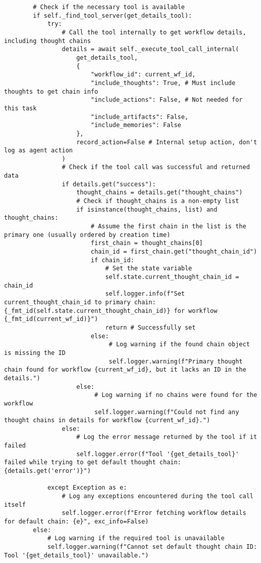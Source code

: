 \documentclass[12pt,a4paper]{article}
\begin{document}
\begin{pageablecode}
\begin{verbatim}
        # Check if the necessary tool is available
        if self._find_tool_server(get_details_tool):
            try:
                # Call the tool internally to get workflow details, including thought chains
                details = await self._execute_tool_call_internal(
                    get_details_tool,
                    {
                        "workflow_id": current_wf_id,
                        "include_thoughts": True, # Must include thoughts to get chain info
                        "include_actions": False, # Not needed for this task
                        "include_artifacts": False,
                        "include_memories": False
                    },
                    record_action=False # Internal setup action, don't log as agent action
                )
                # Check if the tool call was successful and returned data
                if details.get("success"):
                    thought_chains = details.get("thought_chains")
                    # Check if thought_chains is a non-empty list
                    if isinstance(thought_chains, list) and thought_chains:
                        # Assume the first chain in the list is the primary one (usually ordered by creation time)
                        first_chain = thought_chains[0]
                        chain_id = first_chain.get("thought_chain_id")
                        if chain_id:
                            # Set the state variable
                            self.state.current_thought_chain_id = chain_id
                            self.logger.info(f"Set current_thought_chain_id to primary chain: {_fmt_id(self.state.current_thought_chain_id)} for workflow {_fmt_id(current_wf_id)}")
                            return # Successfully set
                        else:
                             # Log warning if the found chain object is missing the ID
                             self.logger.warning(f"Primary thought chain found for workflow {current_wf_id}, but it lacks an ID in the details.")
                    else:
                         # Log warning if no chains were found for the workflow
                         self.logger.warning(f"Could not find any thought chains in details for workflow {current_wf_id}.")
                else:
                    # Log the error message returned by the tool if it failed
                    self.logger.error(f"Tool '{get_details_tool}' failed while trying to get default thought chain: {details.get('error')}")

            except Exception as e:
                # Log any exceptions encountered during the tool call itself
                self.logger.error(f"Error fetching workflow details for default chain: {e}", exc_info=False)
        else:
            # Log warning if the required tool is unavailable
            self.logger.warning(f"Cannot set default thought chain ID: Tool '{get_details_tool}' unavailable.")


\end{verbatim}
\end{pageablecode}
\end{document}
